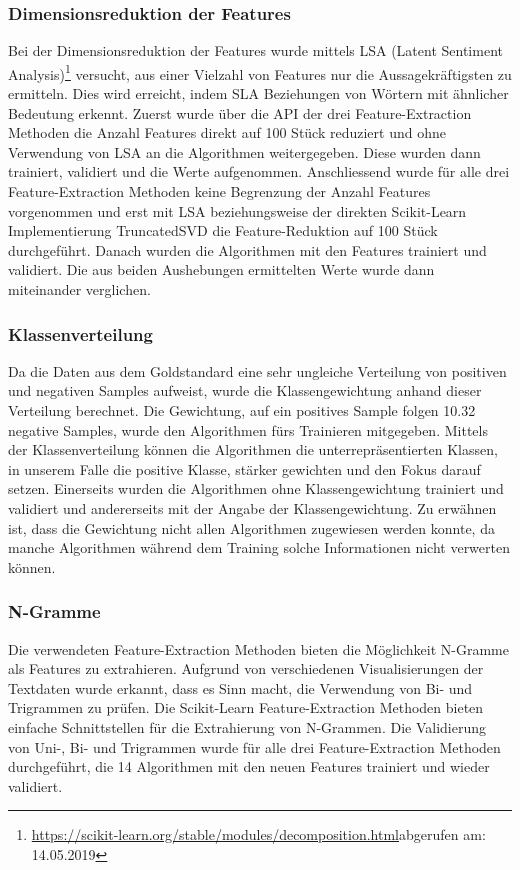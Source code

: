 \subsubsection{Dimensionsreduktion der Features}
Bei der Dimensionsreduktion der Features wurde mittels LSA (Latent Sentiment Analysis)\footnote{\url{https://scikit-learn.org/stable/modules/decomposition.html}abgerufen am: 14.05.2019} versucht, aus einer Vielzahl von Features nur die Aussagekräftigsten zu ermitteln.
Dies wird erreicht, indem SLA Beziehungen von Wörtern mit ähnlicher Bedeutung erkennt.
Zuerst wurde über die API der drei Feature-Extraction Methoden die Anzahl Features direkt auf 100 Stück reduziert und ohne Verwendung von LSA an die Algorithmen weitergegeben.
Diese wurden dann trainiert, validiert und die Werte aufgenommen.
Anschliessend wurde für alle drei Feature-Extraction Methoden keine Begrenzung der Anzahl Features vorgenommen und erst mit LSA beziehungsweise der direkten Scikit-Learn Implementierung \glqq TruncatedSVD\grqq{} die Feature-Reduktion auf 100 Stück durchgeführt.
Danach wurden die Algorithmen mit den Features trainiert und validiert.
Die aus beiden Aushebungen ermittelten Werte wurde dann miteinander verglichen.
\subsubsection{Klassenverteilung}
Da die Daten aus dem Goldstandard eine sehr ungleiche Verteilung von positiven und negativen Samples aufweist, wurde die Klassengewichtung anhand dieser Verteilung berechnet.
Die Gewichtung, auf ein positives Sample folgen 10.32 negative Samples, wurde den Algorithmen fürs Trainieren mitgegeben.
Mittels der Klassenverteilung können die Algorithmen die unterrepräsentierten Klassen, in unserem Falle die positive Klasse, stärker gewichten und den Fokus darauf setzen.
Einerseits wurden die Algorithmen ohne Klassengewichtung trainiert und validiert und andererseits mit der Angabe der Klassengewichtung.
Zu erwähnen ist, dass die Gewichtung nicht allen Algorithmen zugewiesen werden konnte, da manche Algorithmen während dem Training solche Informationen nicht verwerten können.
\subsubsection{N-Gramme}
Die verwendeten Feature-Extraction Methoden bieten die Möglichkeit N-Gramme als Features zu extrahieren.
Aufgrund von verschiedenen Visualisierungen der Textdaten wurde erkannt, dass es Sinn macht, die Verwendung von Bi- und Trigrammen zu prüfen.
Die Scikit-Learn Feature-Extraction Methoden bieten einfache Schnittstellen für die Extrahierung von N-Grammen.
Die Validierung von Uni-, Bi- und Trigrammen wurde für alle drei Feature-Extraction Methoden durchgeführt, die 14 Algorithmen mit den neuen Features trainiert und wieder validiert.
